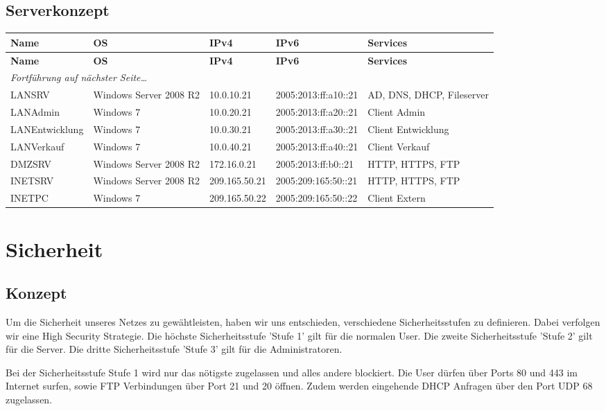 \documentclass[11pt,a4paper,parskip=half]{scrartcl}
\begin{document}
\subsection{Serverkonzept}
\begin{longtable}{p{3cm}|p{2.5cm}|p{2.3cm}|p{3.5cm}|p{3cm}}
	\textbf{Name} & \textbf{OS} & \textbf{IPv4} & \textbf{IPv6} & \textbf{Services}\\
	\hline
	\endfirsthead
	\textbf{Name} & \textbf{OS} & \textbf{IPv4} & \textbf{IPv6} & \textbf{Services}\\
	\hline
	\endhead
	\hline
	\multicolumn{2}{l}{\textit{Fortführung auf nächster Seite\ldots}} \\
	\endfoot
	\endlastfoot
	LANSRV & Windows Server 2008 R2 & 10.0.10.21 & 2005:2013:ff:a10::21 & AD, DNS, DHCP, Fileserver\\
	LANAdmin & Windows 7 & 10.0.20.21 & 2005:2013:ff:a20::21 & Client Admin\\
	LANEntwicklung & Windows 7 & 10.0.30.21 & 2005:2013:ff:a30::21 & Client Entwicklung\\
	LANVerkauf & Windows 7 & 10.0.40.21 & 2005:2013:ff:a40::21 & Client Verkauf\\
	DMZSRV & Windows Server 2008 R2	& 172.16.0.21 & 2005:2013:ff:b0::21	& HTTP, HTTPS, FTP\\
	INETSRV	& Windows Server 2008 R2 & 209.165.50.21 & 2005:209:165:50::21 & HTTP, HTTPS, FTP\\
	INETPC & Windows 7 & 209.165.50.22 & 2005:209:165:50::22 & Client Extern\\
\end{longtable}


\section{Sicherheit}
\subsection{Konzept}
Um die Sicherheit unseres Netzes zu gewähtleisten, haben wir uns entschieden, verschiedene Sicherheitsstufen zu definieren. Dabei verfolgen wir eine High Security Strategie. Die höchste Sicherheitsstufe 'Stufe 1' gilt für die normalen User. Die zweite Sicherheitsstufe 'Stufe 2' gilt für die Server. Die dritte Sicherheitsstufe 'Stufe 3' gilt für die Administratoren.

Bei der Sicherheitsstufe Stufe 1 wird nur das nötigste zugelassen und alles andere blockiert. Die User dürfen über Ports 80 und 443 im Internet surfen, sowie FTP Verbindungen über Port 21 und 20 öffnen. Zudem werden eingehende DHCP Anfragen über den Port UDP 68 zugelassen.
\end{document}
